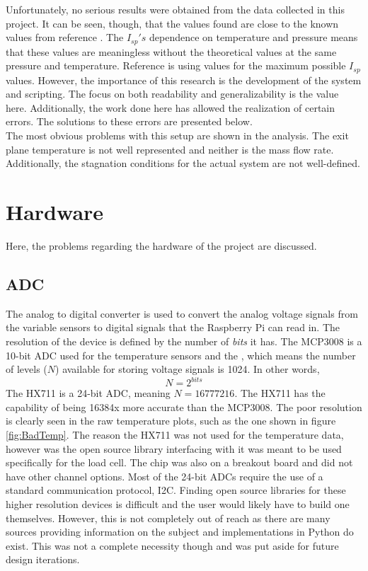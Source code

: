 Unfortunately, no serious results were obtained from the data collected in this project. It can be seen, though, that the values found are close to the known values from reference \cite{anis}. The $I_{sp}'s$ dependence on temperature and pressure means that these values are meaningless without the theoretical values at the same pressure and temperature. Reference \cite{anis} is using values for the maximum possible $I_{sp}$ values. However, the importance of this research is the development of the system and  scripting. The focus on both readability and generalizability is the value here. Additionally, the work done here has allowed the realization of certain errors. The solutions to these errors are presented below.\\
The most obvious problems with this setup are shown in the analysis. The exit plane temperature is not well represented and neither is the mass flow rate. Additionally, the stagnation conditions for the actual system are not well-defined.
\section{Hardware}
Here, the problems regarding the hardware of the project are discussed.
\subsection{ADC}
The analog to digital converter is used to convert the analog voltage signals from the variable sensors to digital signals that the Raspberry Pi can read in. The resolution of the device is defined by the number of \textit{bits} it has. The MCP3008 is a 10-bit ADC used for the temperature sensors and the , which means the number of levels ($N$) available for storing voltage signals is 1024. In other words,
\begin{equation}
N=2^{bits}
\end{equation}
The HX711 is a 24-bit ADC, meaning $N=16777216$. The HX711 has the capability of being 16384x more accurate than the MCP3008. The poor resolution is clearly seen in the raw temperature plots, such as the one shown in figure \ref{fig:BadTemp}. The reason the HX711 was not used for the temperature data, however was the open source library interfacing with it was meant to be used specifically for the load cell. The chip was also on a breakout board and did not have other channel options. Most of the 24-bit ADCs require the use of a standard communication protocol, I2C. Finding open source libraries for these higher resolution devices is difficult and the user would likely have to build one themselves. However, this is not completely out of reach as there are many sources providing information on the subject and implementations in Python do exist. This was not a complete necessity though and was put aside for future design iterations.
